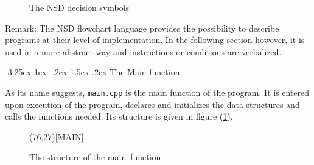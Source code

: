 \documentclass{report}
\makeatletter
\renewcommand\paragraph{\@startsection{paragraph}{4}{\z@}%
  {-3.25ex\@plus -1ex \@minus -.2ex}%
  {1.5ex \@plus .2ex}%
  {\normalfont\normalsize\bfseries}}
\makeatother
\begin{document}
\begin{figure}[H]
\centering
{}
\caption{The NSD decision symbols }
\end{figure}




Remark: The NSD flowchart language provides the possibility to describe programs at their level of implementation. In the following section however, it is used in a more abstract way and instructions or conditions are verbalized. 
 
\paragraph{The Main function}


As its name suggests, {\tt main.cpp} is the main function of the program. It is entered upon execution of the program, declares and initializes the data structures and calls the functions needed. Its structure is given in figure (\ref{fig:main_structure}).

\begin{figure}[H]
\label{fig:main_structure}
\begin{center}
\begin{struktogramm}(76,27)[MAIN]
\end{struktogramm}
\end{center}

\caption{The structure of the main--function}
\end{figure}
\end{document}
